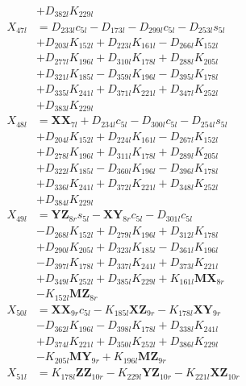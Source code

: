 \begin{multicols}{2}
\begin{align}
&+ D_{382l}K_{229l} \nonumber \\
X_{47l} &= D_{233l}c_{5l} - D_{173l} - D_{299l}c_{5l} - D_{253l}s_{5l}  \nonumber \\
&+ D_{203l}K_{152l} + D_{223l}K_{161l} - D_{266l}K_{152l}  \nonumber \\
&+ D_{277l}K_{196l} + D_{310l}K_{178l} + D_{288l}K_{205l}  \nonumber \\
&+ D_{321l}K_{185l} - D_{359l}K_{196l} - D_{395l}K_{178l}  \nonumber \\
&+ D_{335l}K_{241l} + D_{371l}K_{221l} + D_{347l}K_{252l}  \nonumber \\
&+ D_{383l}K_{229l} \nonumber \\
X_{48l} &= \mathbf{XX}_{7l} + D_{234l}c_{5l} - D_{300l}c_{5l} - D_{254l}s_{5l}  \nonumber \\
&+ D_{204l}K_{152l} + D_{224l}K_{161l} - D_{267l}K_{152l}  \nonumber \\
&+ D_{278l}K_{196l} + D_{311l}K_{178l} + D_{289l}K_{205l}  \nonumber \\
&+ D_{322l}K_{185l} - D_{360l}K_{196l} - D_{396l}K_{178l}  \nonumber \\
&+ D_{336l}K_{241l} + D_{372l}K_{221l} + D_{348l}K_{252l}  \nonumber \\
&+ D_{384l}K_{229l} \nonumber \\
X_{49l} &= \mathbf{YZ}_{8r}s_{5l} - \mathbf{XY}_{8r}c_{5l} - D_{301l}c_{5l}  \nonumber \\
&- D_{268l}K_{152l} + D_{279l}K_{196l} + D_{312l}K_{178l}  \nonumber \\
&+ D_{290l}K_{205l} + D_{323l}K_{185l} - D_{361l}K_{196l}  \nonumber \\
&- D_{397l}K_{178l} + D_{337l}K_{241l} + D_{373l}K_{221l}  \nonumber \\
&+ D_{349l}K_{252l} + D_{385l}K_{229l} + K_{161l}\mathbf{MX}_{8r}  \nonumber \\
&- K_{152l}\mathbf{MZ}_{8r} \nonumber \\
X_{50l} &= \mathbf{XX}_{9r}c_{5l} - K_{185l}\mathbf{XZ}_{9r} - K_{178l}\mathbf{XY}_{9r}  \nonumber \\
&- D_{362l}K_{196l} - D_{398l}K_{178l} + D_{338l}K_{241l}  \nonumber \\
&+ D_{374l}K_{221l} + D_{350l}K_{252l} + D_{386l}K_{229l}  \nonumber \\
&- K_{205l}\mathbf{MY}_{9r} + K_{196l}\mathbf{MZ}_{9r} \nonumber \\
X_{51l} &= K_{178l}\mathbf{ZZ}_{10r} - K_{229l}\mathbf{YZ}_{10r} - K_{221l}\mathbf{XZ}_{10r}  \nonumber \\

\end{align}
\end{multicols}
